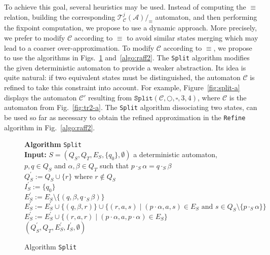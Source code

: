 \documentclass[]{llncs}
\def \spt {\hspace*{0.3cm}}
\def \A {\mathcal{A}}
\def \T {\mathcal{T}}
\def \C {\mathcal{C}}
\begin{document}
To achieve this goal, several heuristics may be used.  Instead of
computing the $\equiv$ relation, building the corresponding
$\T^{j}_\C(\A)/_\equiv$ automaton, and then performing the fixpoint
computation, we propose to use a dynamic approach.  More precisely, we
prefer to modify $\C$ according to $\equiv$ to avoid similar states
merging which may lead to a coarser over-approximation. To modify $\C$
according to $\equiv$, we propose to use the algorithms in
Figs.~\ref{algo:raff} and~\ref{algo:raff2}. The {\tt Split} algorithm
modifies the given deterministic automaton to provide a weaker
abstraction.  Its idea is quite natural: if two equivalent states must
be distinguished, the automaton $\C$ is refined to take this
constraint into account.  For example, Figure~\ref{fig:split-a}
displays the automaton $\C'$ resulting from
$\mathtt{Split}(\C,\bigcirc,\square,3,4)$, where $\C$ is the automaton
from Fig.~\ref{fig:tr2-a}. The {\tt Split} algorithm dissociating two states, can be used so far
as necessary to obtain the refined approximation in the {\tt Refine}
algorithm in Fig.~\ref{algo:raff2}.


\begin{figure}[tb]
{\bf Algorithm} {\tt Split}\\
{\bf Input:} $S=(Q_S,Q_T,E_S,\{q_0\},\emptyset)$ a deterministic automaton, $p,q\in
Q_S$ and $\alpha,\beta\in Q_T$ such that $p\cdot_S \alpha=q\cdot_S \beta$\\
\spt $Q_S^\prime:=Q_S\cup\{r\}$ where $r\notin Q_S$\\
\spt $I^\prime_S:=\{q_0\}$\\
\spt $E_S^\prime:=E_S\setminus \{(q,\beta,q\cdot_S\beta)\}$\\
\spt $E_S^\prime:=E_S^\prime\cup
\{(q,\beta,r)\}\cup\{(r,a,s)\mid (p\cdot\alpha,a,s)\in
E_S \text{ and } s\in Q_S\setminus\{p\cdot_S\alpha\}\}$\\
\spt $E_S^\prime:=E_S^\prime\cup\{(r,a,r)\mid (p\cdot\alpha,a,p\cdot\alpha)\in
E_S \}$\\
\spt {\bf Return} $(Q^\prime_S,Q_T,E_S^\prime,I_S^\prime,\emptyset)$
\caption{Algorithm {\tt Split}}\label{algo:raff}
\end{figure}
\end{document}
